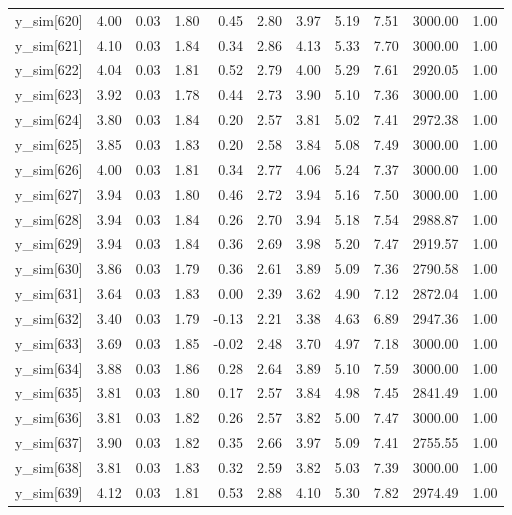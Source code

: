 \begin{table}[ht]
\begin{tabular}{rrrrrrrrrrr}
  y\_sim[620] & 4.00 & 0.03 & 1.80 & 0.45 & 2.80 & 3.97 & 5.19 & 7.51 & 3000.00 & 1.00 \\ 
  y\_sim[621] & 4.10 & 0.03 & 1.84 & 0.34 & 2.86 & 4.13 & 5.33 & 7.70 & 3000.00 & 1.00 \\ 
  y\_sim[622] & 4.04 & 0.03 & 1.81 & 0.52 & 2.79 & 4.00 & 5.29 & 7.61 & 2920.05 & 1.00 \\ 
  y\_sim[623] & 3.92 & 0.03 & 1.78 & 0.44 & 2.73 & 3.90 & 5.10 & 7.36 & 3000.00 & 1.00 \\ 
  y\_sim[624] & 3.80 & 0.03 & 1.84 & 0.20 & 2.57 & 3.81 & 5.02 & 7.41 & 2972.38 & 1.00 \\ 
  y\_sim[625] & 3.85 & 0.03 & 1.83 & 0.20 & 2.58 & 3.84 & 5.08 & 7.49 & 3000.00 & 1.00 \\ 
  y\_sim[626] & 4.00 & 0.03 & 1.81 & 0.34 & 2.77 & 4.06 & 5.24 & 7.37 & 3000.00 & 1.00 \\ 
  y\_sim[627] & 3.94 & 0.03 & 1.80 & 0.46 & 2.72 & 3.94 & 5.16 & 7.50 & 3000.00 & 1.00 \\ 
  y\_sim[628] & 3.94 & 0.03 & 1.84 & 0.26 & 2.70 & 3.94 & 5.18 & 7.54 & 2988.87 & 1.00 \\ 
  y\_sim[629] & 3.94 & 0.03 & 1.84 & 0.36 & 2.69 & 3.98 & 5.20 & 7.47 & 2919.57 & 1.00 \\ 
  y\_sim[630] & 3.86 & 0.03 & 1.79 & 0.36 & 2.61 & 3.89 & 5.09 & 7.36 & 2790.58 & 1.00 \\ 
  y\_sim[631] & 3.64 & 0.03 & 1.83 & 0.00 & 2.39 & 3.62 & 4.90 & 7.12 & 2872.04 & 1.00 \\ 
  y\_sim[632] & 3.40 & 0.03 & 1.79 & -0.13 & 2.21 & 3.38 & 4.63 & 6.89 & 2947.36 & 1.00 \\ 
  y\_sim[633] & 3.69 & 0.03 & 1.85 & -0.02 & 2.48 & 3.70 & 4.97 & 7.18 & 3000.00 & 1.00 \\ 
  y\_sim[634] & 3.88 & 0.03 & 1.86 & 0.28 & 2.64 & 3.89 & 5.10 & 7.59 & 3000.00 & 1.00 \\ 
  y\_sim[635] & 3.81 & 0.03 & 1.80 & 0.17 & 2.57 & 3.84 & 4.98 & 7.45 & 2841.49 & 1.00 \\ 
  y\_sim[636] & 3.81 & 0.03 & 1.82 & 0.26 & 2.57 & 3.82 & 5.00 & 7.47 & 3000.00 & 1.00 \\ 
  y\_sim[637] & 3.90 & 0.03 & 1.82 & 0.35 & 2.66 & 3.97 & 5.09 & 7.41 & 2755.55 & 1.00 \\ 
  y\_sim[638] & 3.81 & 0.03 & 1.83 & 0.32 & 2.59 & 3.82 & 5.03 & 7.39 & 3000.00 & 1.00 \\ 
  y\_sim[639] & 4.12 & 0.03 & 1.81 & 0.53 & 2.88 & 4.10 & 5.30 & 7.82 & 2974.49 & 1.00 \\ 

\end{tabular}
\end{table}
